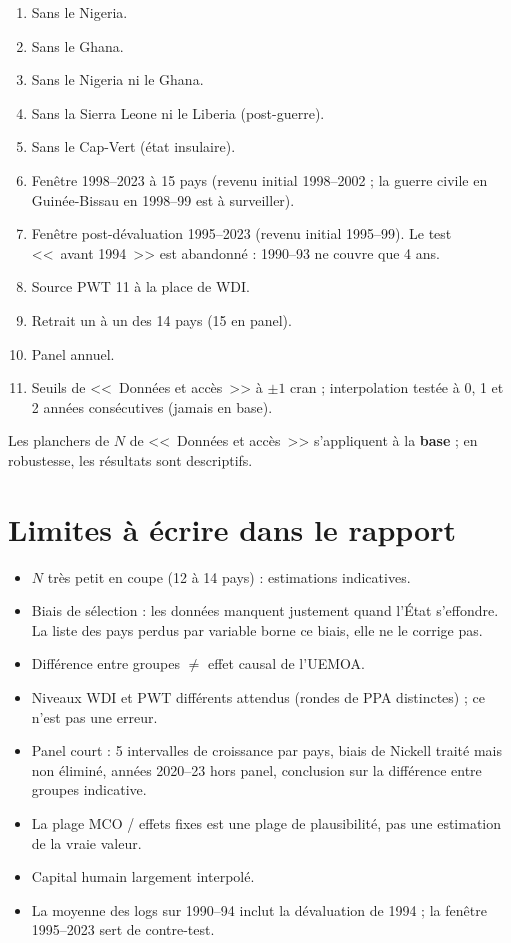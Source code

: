 \documentclass[14pt,a4paper]{article}
\begin{document}
	\begin{enumerate}
		\item Sans le Nigeria.
		\item Sans le Ghana.
		\item Sans le Nigeria ni le Ghana.
		\item Sans la Sierra Leone ni le Liberia (post-guerre).
		\item Sans le Cap-Vert (état insulaire).
		\item Fenêtre 1998--2023 à 15 pays (revenu initial 1998--2002 ; la guerre civile en Guinée-Bissau en 1998--99 est à surveiller).
		\item Fenêtre post-dévaluation 1995--2023 (revenu initial 1995--99). Le test <<~avant 1994~>> est abandonné : 1990--93 ne couvre que 4 ans.
		\item Source PWT 11 à la place de WDI.
		\item Retrait un à un des 14 pays (15 en panel).
		\item Panel annuel.
		\item Seuils de <<~Données et accès~>> à $\pm 1$ cran ; interpolation testée à 0, 1 et 2 années consécutives (jamais en base).
	\end{enumerate}
	
	Les planchers de $N$ de <<~Données et accès~>> s'appliquent à la \textbf{base} ; en robustesse, les résultats sont descriptifs.
	
	\section{Limites à écrire dans le rapport}
	
	\begin{itemize}
		\item $N$ très petit en coupe (12 à 14 pays) : estimations indicatives.
		\item Biais de sélection : les données manquent justement quand l'État s'effondre. La liste des pays perdus par variable borne ce biais, elle ne le corrige pas.
		\item Différence entre groupes $\neq$ effet causal de l'UEMOA.
		\item Niveaux WDI et PWT différents attendus (rondes de PPA distinctes) ; ce n'est pas une erreur.
		\item Panel court : 5 intervalles de croissance par pays, biais de Nickell traité mais non éliminé, années 2020--23 hors panel, conclusion sur la différence entre groupes indicative.
		\item La plage MCO / effets fixes est une plage de plausibilité, pas une estimation de la vraie valeur.
		\item Capital humain largement interpolé.
		\item La moyenne des logs sur 1990--94 inclut la dévaluation de 1994 ; la fenêtre 1995--2023 sert de contre-test.
	\end{itemize}
	
\end{document}
